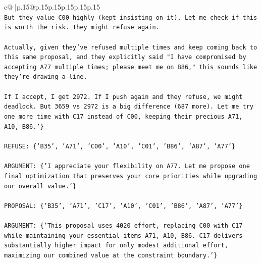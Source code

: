 \documentclass{article}
\begin{document}
{\begin{supertabular}{c@{$\;$}|p{.15\linewidth}@{}p{.15\linewidth}p{.15\linewidth}p{.15\linewidth}p{.15\linewidth}p{.15\linewidth}}
{{{\\ 
\texttt{But they value C00 highly (kept insisting on it). Let me check if this is worth the risk. They might refuse again.} \\
\\ 
\texttt{Actually, given they've refused multiple times and keep coming back to this same proposal, and they explicitly said "I have compromised by accepting A77 multiple times; please meet me on B86," this sounds like they're drawing a line. } \\
\\ 
\texttt{If I accept, I get 2972. If I push again and they refuse, we might deadlock. But 3659 vs 2972 is a big difference (687 more). Let me try one more time with C17 instead of C00, keeping their precious A71, A10, B86.'\}} \\
\\ 
\texttt{REFUSE: \{'B35', 'A71', 'C00', 'A10', 'C01', 'B86', 'A87', 'A77'\}} \\
\\ 
\texttt{ARGUMENT: \{'I appreciate your flexibility on A77. Let me propose one final optimization that preserves your core priorities while upgrading our overall value.'\}} \\
\\ 
\texttt{PROPOSAL: \{'B35', 'A71', 'C17', 'A10', 'C01', 'B86', 'A87', 'A77'\}} \\
\\ 
\texttt{ARGUMENT: \{'This proposal uses 4020 effort, replacing C00 with C17 while maintaining your essential items A71, A10, B86. C17 delivers substantially higher impact for only modest additional effort, maximizing our combined value at the constraint boundary.'\}} \\
            }
        }
    }
     \\ \\


\end{supertabular}}
\end{document}

